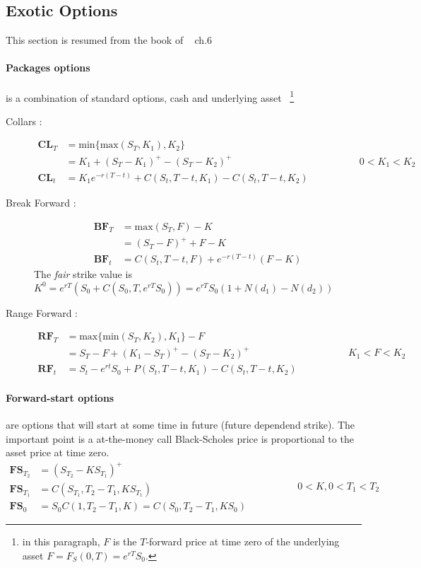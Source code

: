 \documentclass[a4paper,10pt]{article}
\begin{document}
\subsection{Exotic Options}
This section is resumed from the book of ~\cite{MAREK} ch.6
\paragraph{Packages options} is a combination of standard options, cash and underlying asset ~\footnote{in this paragraph, $F$ is the $T$-forward price at time zero of the underlying asset $F = F_{S}(0,T)= e^{rT} S_0$.}
\begin{description}
 \item[Collars : ] 
\[ 
\begin{array}{rl}
\textbf{CL}_T &= \text{min}\{ \text{max}(S_T,K_1),K_2\} \\
              &= K_1 +(S_T-K_1)^+ - (S_T - K_2)^+       \\
\textbf{CL}_t &= K_1e^{-r(T-t)} + C(S_t,T-t,K_1)- C(S_t,T-t,K_2)
\end{array} 
\hspace{2cm} 0 < K_1 < K_2 
\]
 \item[Break Forward : ] 
\[
\begin{array}{rl}
 \textbf{BF}_T &= \text{max}(S_T,F)-K \\
               &= (S_T- F)^+ +F -K    \\
 \textbf{BF}_t &= C(S_t,T-t,F) + e^{-r(T-t)}(F-K) 
\end{array} 
\]
The \textit{fair} strike value is $K^0 = e^{rT}( S_0 + C(S_0,T, e^{rT}S_0) ) = e^{rT}S_0 (1 + N(d_1) - N(d_2) ) $
\item[Range Forward : ] 
\[
\begin{array}{rl}
\textbf{RF}_T  &= \text{max}\{ \text{min}(S_T,K_2),K_1\} - F  \\
               &= S_T - F +(K_1 - S_T)^+ - (S_T-K_2)^+        \\
\textbf{RF}_t  &= S_t - e^{rt}S_{0} + P(S_t,T-t,K_1) - C(S_t,T-t,K_2)
\end{array} 
\hspace{2cm} K_1<F<K_2
\]
\end{description}
\paragraph{Forward-start options} are options that will start at some time in future (future dependend strike). The important point is a at-the-money call Black-Scholes price is proportional to the asset price at time zero.
\[
\begin{array}{rl}
\textbf{FS}_{T_2} &=  (S_{T_2} - KS_{T_1})^+  \\
\textbf{FS}_{T_1} &= C( S_{T_1},T_2 - T_1, KS_{T_1} )    \\
\textbf{FS}_{0} &= S_0 C( 1,T_2 - T_1, K ) = C( S_0 ,T_2 - T_1, KS_0 ) 
\end{array}
\hspace{2cm}
0<K,0<T_1<T_2
\]
\end{document}
